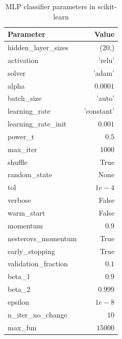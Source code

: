 \begin{table}[H]
    \footnotesize
    \centering
    \caption[MLP classifier parameters in scikit-learn]{MLP classifier parameters in scikit-learn \cite{noauthor_sklearnneural_networkmlpclassifier_nodate}} \label{tab:mlp_param} 
    \begin{tabular}{lr}\toprule
        Parameter & Value \\\midrule
        hidden\_layer\_sizes & (20,) \\
        activation & 'relu' \\
        solver & 'adam' \\
        alpha & $0.0001$ \\
        batch\_size & 'auto' \\
        learning\_rate & 'constant' \\
        learning\_rate\_init & $0.001$ \\
        power\_t & $0.5$ \\
        max\_iter & 1000 \\
        shuffle & True \\
        random\_state & None \\
        tol & $1e-4$ \\
        verbose & False \\
        warm\_start & False \\
        momentum & $0.9$ \\
        nesterovs\_momentum & True \\
        early\_stopping & True \\
        validation\_fraction & $0.1$ \\
        beta\_1 & $0.9$ \\
        beta\_2 & $0.999$ \\
        epsilon & $1e-8$ \\
        n\_iter\_no\_change & $10$ \\
        max\_fun & $15000$ \\\bottomrule
    \end{tabular}
\end{table}

